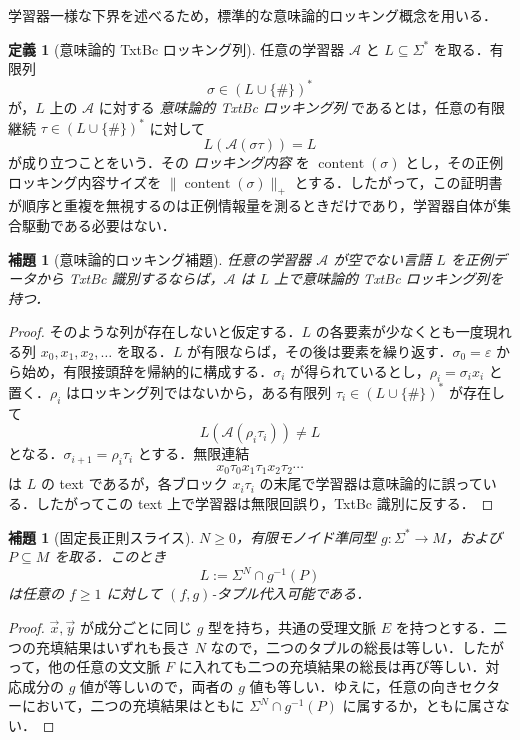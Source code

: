 \documentclass[11pt,a4paper]{ltjsarticle}
\numberwithin{equation}{section}
\theoremstyle{plain}
\newtheorem{lemma}[theorem]{補題}
\theoremstyle{definition}
\newtheorem{definition}[theorem]{定義}
\theoremstyle{remark}
\newcommand{\tuple}[1]{\vec{#1}}
\newcommand{\eps}{\varepsilon}
\begin{document}
学習器一様な下界を述べるため，標準的な意味論的ロッキング概念を用いる．
\begin{definition}[意味論的 TxtBc ロッキング列]
\label{def:semantic-locking-sequence}
任意の学習器 \(\mathcal A\) と \(L\subseteq\Sigma^*\) を取る．有限列
\[
  \sigma\in(L\cup\{\#\})^*
\]
が，\(L\) 上の \(\mathcal A\) に対する \emph{意味論的 TxtBc ロッキング列} であるとは，任意の有限継続
\(\tau\in(L\cup\{\#\})^*\) に対して
\[
  L(\mathcal A(\sigma\tau))=L
\]
が成り立つことをいう．その \emph{ロッキング内容} を
\(\operatorname{content}(\sigma)\) とし，その正例ロッキング内容サイズを
\(\|\operatorname{content}(\sigma)\|_+\) とする．したがって，この証明書が順序と重複を無視するのは正例情報量を測るときだけであり，学習器自体が集合駆動である必要はない．
\end{definition}

\begin{lemma}[意味論的ロッキング補題]
\label{lem:semantic-locking-exists}
任意の学習器 \(\mathcal A\) が空でない言語 \(L\) を正例データから TxtBc 識別するならば，\(\mathcal A\) は \(L\) 上で意味論的 TxtBc ロッキング列を持つ．
\end{lemma}

\begin{proof}
そのような列が存在しないと仮定する．\(L\) の各要素が少なくとも一度現れる列
\(x_0,x_1,x_2,\ldots\) を取る．\(L\) が有限ならば，その後は要素を繰り返す．\(\sigma_0=\eps\) から始め，有限接頭辞を帰納的に構成する．\(\sigma_i\) が得られているとし，\(\rho_i=\sigma_i x_i\) と置く．\(\rho_i\) はロッキング列ではないから，ある有限列
\(\tau_i\in(L\cup\{\#\})^*\) が存在して
\[
  L(\mathcal A(\rho_i\tau_i))\ne L
\]
となる．\(\sigma_{i+1}=\rho_i\tau_i\) とする．無限連結
\[
  x_0\tau_0x_1\tau_1x_2\tau_2\cdots
\]
は \(L\) の text であるが，各ブロック \(x_i\tau_i\) の末尾で学習器は意味論的に誤っている．したがってこの text 上で学習器は無限回誤り，TxtBc 識別に反する．
\end{proof}


\begin{lemma}[固定長正則スライス]
\label{lem:fixed-length-regular-slices}
\(N\ge0\)，有限モノイド準同型 \(g:\Sigma^*\to M\)，および \(P\subseteq M\) を取る．このとき
\[
  L:=\Sigma^N\cap g^{-1}(P)
\]
は任意の \(f\ge1\) に対して \((f,g)\)-タプル代入可能である．
\end{lemma}

\begin{proof}
\(\tuple x,\tuple y\) が成分ごとに同じ \(g\) 型を持ち，共通の受理文脈 \(E\) を持つとする．二つの充填結果はいずれも長さ \(N\) なので，二つのタプルの総長は等しい．したがって，他の任意の文文脈 \(F\) に入れても二つの充填結果の総長は再び等しい．対応成分の \(g\) 値が等しいので，両者の \(g\) 値も等しい．ゆえに，任意の向きセクターにおいて，二つの充填結果はともに \(\Sigma^N\cap g^{-1}(P)\) に属するか，ともに属さない．
\end{proof}
\end{document}
